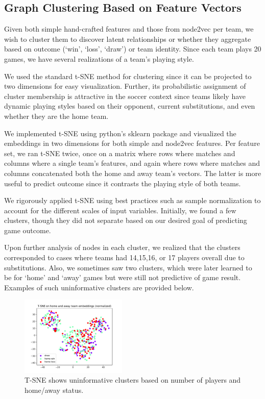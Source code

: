 \subsection{Graph Clustering Based on Feature Vectors}
Given both simple hand-crafted features and those from node2vec per team, we wish to cluster them to discover latent relationships or whether they aggregate based on outcome (`win', `loss', `draw') or team identity. Since each team plays 20 games, we have several realizations of a team's playing style.

We used the standard t-SNE method for clustering since it can be projected to two dimensions for easy visualization. Further, its probabilistic assignment of cluster membership is attractive in the soccer context since teams likely have dynamic playing styles based on their opponent, current substitutions, and even whether they are the home team.

We implemented t-SNE using python's  sklearn package and visualized the embeddings in two dimensions for both simple and node2vec features. Per feature set, we ran t-SNE twice, once on a matrix where rows where matches and columns where a single team's features, and again where rows where matches and columns concatenated both the home and away team's vectors. The latter is more useful to predict outcome since it contrasts the playing style of both teams.

We rigorously applied t-SNE using best practices such as sample normalization to account for the different scales of input variables. Initially, we found a few clusters, though they did not separate based on our desired goal of predicting game outcome.


Upon further analysis of nodes in each cluster, we realized that the clusters corresponded to cases where teams had 14,15,16, or 17 players overall due to substitutions. Also, we sometimes saw two clusters, which were later learned to be for `home' and `away' games but were still not predictive of game result. Examples of such uninformative clusters are provided below. 

\begin{figure}[h]
  \centering
  \includegraphics[width=0.45\textwidth]{plots/game_NORM_tsne.pdf}
  \caption{T-SNE shows uninformative clusters based on number of players and home/away status.}
\end{figure}


